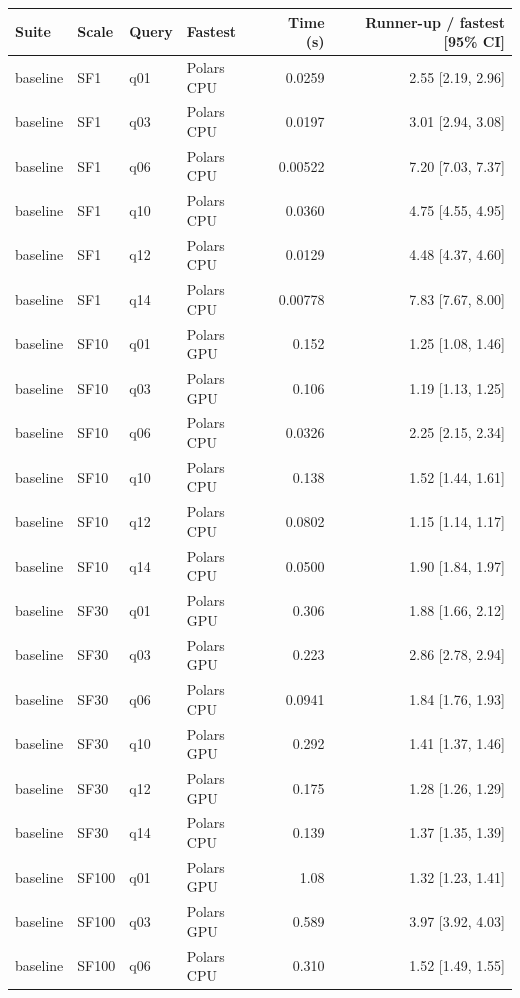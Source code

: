 \begin{longtable}{llllrr}
\toprule
Suite & Scale & Query & Fastest & Time (s) & Runner-up / fastest [95\% CI] \\
\midrule
\endhead
\bottomrule
\endfoot
baseline & SF1 & q01 & Polars CPU & 0.0259 & 2.55 [2.19, 2.96] \\
baseline & SF1 & q03 & Polars CPU & 0.0197 & 3.01 [2.94, 3.08] \\
baseline & SF1 & q06 & Polars CPU & 0.00522 & 7.20 [7.03, 7.37] \\
baseline & SF1 & q10 & Polars CPU & 0.0360 & 4.75 [4.55, 4.95] \\
baseline & SF1 & q12 & Polars CPU & 0.0129 & 4.48 [4.37, 4.60] \\
baseline & SF1 & q14 & Polars CPU & 0.00778 & 7.83 [7.67, 8.00] \\
baseline & SF10 & q01 & Polars GPU & 0.152 & 1.25 [1.08, 1.46] \\
baseline & SF10 & q03 & Polars GPU & 0.106 & 1.19 [1.13, 1.25] \\
baseline & SF10 & q06 & Polars CPU & 0.0326 & 2.25 [2.15, 2.34] \\
baseline & SF10 & q10 & Polars CPU & 0.138 & 1.52 [1.44, 1.61] \\
baseline & SF10 & q12 & Polars CPU & 0.0802 & 1.15 [1.14, 1.17] \\
baseline & SF10 & q14 & Polars CPU & 0.0500 & 1.90 [1.84, 1.97] \\
baseline & SF30 & q01 & Polars GPU & 0.306 & 1.88 [1.66, 2.12] \\
baseline & SF30 & q03 & Polars GPU & 0.223 & 2.86 [2.78, 2.94] \\
baseline & SF30 & q06 & Polars CPU & 0.0941 & 1.84 [1.76, 1.93] \\
baseline & SF30 & q10 & Polars GPU & 0.292 & 1.41 [1.37, 1.46] \\
baseline & SF30 & q12 & Polars GPU & 0.175 & 1.28 [1.26, 1.29] \\
baseline & SF30 & q14 & Polars CPU & 0.139 & 1.37 [1.35, 1.39] \\
baseline & SF100 & q01 & Polars GPU & 1.08 & 1.32 [1.23, 1.41] \\
baseline & SF100 & q03 & Polars GPU & 0.589 & 3.97 [3.92, 4.03] \\
baseline & SF100 & q06 & Polars CPU & 0.310 & 1.52 [1.49, 1.55] \\

\end{longtable}

